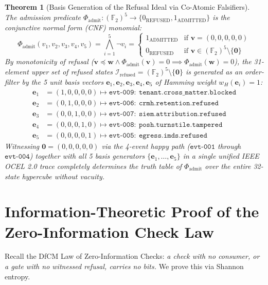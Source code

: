 \documentclass[10pt,twoside,openany]{book}
\theoremstyle{plain}
\newtheorem{theorem}{Theorem}[chapter]
\theoremstyle{definition}
\theoremstyle{remark}
\newcommand{\F}{\mathbb{F}}
\begin{document}
\begin{theorem}[Basis Generation of the Refusal Ideal via Co-Atomic Falsifiers]
The admission predicate $\Phi_{\mathrm{admit}}: (\F_2)^5 \to \{0_{\mathrm{REFUSED}}, 1_{\mathrm{ADMITTED}}\}$ is the conjunctive normal form (CNF) monomial:
\begin{equation}
\Phi_{\mathrm{admit}}(v_1, v_2, v_3, v_4, v_5) = \bigwedge_{i=1}^5 \neg v_i = \begin{cases}
1_{\mathrm{ADMITTED}} & \text{if } \mathbf{v} = (0, 0, 0, 0, 0) \\
0_{\mathrm{REFUSED}} & \text{if } \mathbf{v} \in (\F_2)^5 \setminus \{\mathbf{0}\}
\end{cases}
\end{equation}
By monotonicity of refusal ($\mathbf{v} \preceq \mathbf{w} \land \Phi_{\mathrm{admit}}(\mathbf{v}) = 0 \implies \Phi_{\mathrm{admit}}(\mathbf{w}) = 0$), the 31-element upper set of refused states $\mathcal{I}_{\mathrm{refused}} = (\F_2)^5 \setminus \{\mathbf{0}\}$ is generated as an order-filter by the 5 unit basis vectors $\mathbf{e}_1, \mathbf{e}_2, \mathbf{e}_3, \mathbf{e}_4, \mathbf{e}_5$ of Hamming weight $w_H(\mathbf{e}_i) = 1$:
\begin{align}
\mathbf{e}_1 &= (1, 0, 0, 0, 0) \mapsto \mathtt{evt\text{-}009:\ tenant.cross\_matter.blocked} \\
\mathbf{e}_2 &= (0, 1, 0, 0, 0) \mapsto \mathtt{evt\text{-}006:\ crmh.retention.refused} \\
\mathbf{e}_3 &= (0, 0, 1, 0, 0) \mapsto \mathtt{evt\text{-}007:\ siem.attribution.refused} \\
\mathbf{e}_4 &= (0, 0, 0, 1, 0) \mapsto \mathtt{evt\text{-}008:\ posh.turnstile.tampered} \\
\mathbf{e}_5 &= (0, 0, 0, 0, 1) \mapsto \mathtt{evt\text{-}005:\ egress.imds.refused}
\end{align}
Witnessing $\mathbf{0} = (0,0,0,0,0)$ via the 4-event happy path ($\mathtt{evt\text{-}001}$ through $\mathtt{evt\text{-}004}$) together with all 5 basis generators $\{\mathbf{e}_1, \dots, \mathbf{e}_5\}$ in a single unified IEEE OCEL 2.0 trace completely determines the truth table of $\Phi_{\mathrm{admit}}$ over the entire 32-state hypercube without vacuity.
\end{theorem}

\section{Information-Theoretic Proof of the Zero-Information Check Law}
Recall the DfCM Law of Zero-Information Checks: \emph{a check with no consumer, or a gate with no witnessed refusal, carries no bits.} We prove this via Shannon entropy.
\end{document}
